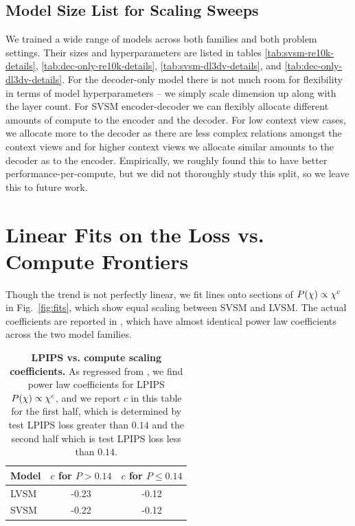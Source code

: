 \subsection{Model Size List for Scaling Sweeps}
\label{supp:size-list}

We trained a wide range of models across both families and both problem settings. Their sizes and hyperparameters are listed in tables \ref{tab:svsm-re10k-details}, \ref{tab:dec-only-re10k-details}, \ref{tab:svsm-dl3dv-details}, and \ref{tab:dec-only-dl3dv-details}. For the decoder-only model there is not much room for flexibility in terms of model hyperparameters -- we simply scale dimension up along with the layer count. For SVSM encoder-decoder we can flexibly allocate different amounts of compute to the encoder and the decoder. For low context view cases, we allocate more to the decoder as there are less complex relations amongst the context views and for higher context views we allocate similar amounts to the decoder as to the encoder. Empirically, we roughly found this to have better performance-per-compute, but we did not thoroughly study this split, so we leave this to future work. 

\section{Linear Fits on the Loss vs. Compute Frontiers}
\label{supp:fits}

Though the trend is not perfectly linear, we fit lines onto sections of  $P(\chi{}) \propto \chi{}^c$ in Fig.~\ref{fig:fits}, which show equal scaling between SVSM and LVSM. The actual coefficients are reported in , which have almost identical power law coefficients across the two model families.



\begin{table}[h]
\footnotesize
\centering
\begin{tabular}{lcc}
\toprule
\textbf{Model} & $c$ for $P > 0.14$ & $c$ for $P \le 0.14$ \\
\midrule
LVSM & -0.23 & -0.12 \\
SVSM & -0.22 & -0.12 \\
\bottomrule
\end{tabular}
\caption{\textbf{LPIPS vs. compute scaling coefficients.} As regressed from  , we find power law coefficients for LPIPS $P(\chi{}) \propto \chi{}^c$, and we report $c$ in this table for the first half, which is determined by test LPIPS loss greater than $0.14$ and the second half which is test LPIPS loss less than $0.14$.
\vspace{-1\baselineskip}
}
\label{tab:lin-fits}
\end{table}

